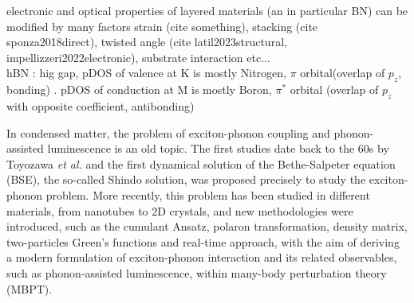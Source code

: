 %
electronic and optical properties of layered materials (an in particular BN) can be modified by many factors
strain (cite something), stacking (cite sponza2018direct), twisted angle (cite latil2023structural, impellizzeri2022electronic), substrate interaction etc...\\
%
hBN : hig gap, pDOS of valence at K is mostly Nitrogen, $\pi$ orbital(overlap of $p_z$, bonding)  . pDOS of conduction at M is mostly Boron, $\pi^*$ orbital (overlap of $p_z$ with opposite coefficient, antibonding)
%
%

In condensed matter, the problem of exciton-phonon coupling and phonon-assisted luminescence is an old topic. The first studies date back to the $60$s by Toyozawa \emph{et al.}\cite{toyozawa2003optical,toyozawa1964interband} and the first dynamical solution of the Bethe-Salpeter equation (BSE), the so-called Shindo solution, was proposed precisely to study the exciton-phonon problem.\cite{shindo1970effective}
More recently, this problem has been studied in different materials, from nanotubes\cite{perebeinos} to 2D crystals, and new methodologies were introduced, such as the cumulant Ansatz\cite{cudazzo2020first}, polaron transformation,\cite{feldtmann2009phonon} density matrix,\cite{brem2020phonon} two-particles Green's functions\cite{antonius2017theory} and real-time approach,\cite{paleari2022coupling} with the aim of deriving a modern formulation of exciton-phonon interaction and its related observables, such as phonon-assisted luminescence, within many-body perturbation theory (MBPT).